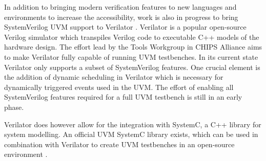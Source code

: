 In addition to bringing modern verification features to new languages and environments to increase the accessibility,
work is also in progress to bring SystemVerilog UVM support to Verilator \cite{uvm_verilator}. Verilator is a popular open-source
Verilog simulator which transpiles Verilog code to executable C++ models of the hardware design. The effort lead by
the Tools Workgroup in CHIPS Alliance aims to make Verilator fully capable of running UVM testbenches. In its current
state Verilator only supports a subset of SystemVerilog features. One crucial element is the addition of dynamic
scheduling in Verilator which is necessary for dynamically triggered events used in the UVM. The effort of enabling all SystemVerilog features required for a full UVM testbench is still in an early phase.

Verilator does however allow for the integration with SystemC, a C++ library for system modelling. An official UVM SystemC library exists, which can be used in combination with Verilator to create UVM testbenches in an open-source environment \cite{Sasselli2023}.


